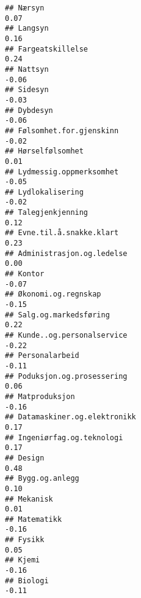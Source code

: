 \documentclass[
]{article}
\begin{document}
\begin{verbatim}
## Nærsyn                                                                            0.07
## Langsyn                                                                           0.16
## Fargeatskillelse                                                                  0.24
## Nattsyn                                                                          -0.06
## Sidesyn                                                                          -0.03
## Dybdesyn                                                                         -0.06
## Følsomhet.for.gjenskinn                                                          -0.02
## Hørselfølsomhet                                                                   0.01
## Lydmessig.oppmerksomhet                                                          -0.05
## Lydlokalisering                                                                  -0.02
## Talegjenkjenning                                                                  0.12
## Evne.til.å.snakke.klart                                                           0.23
## Administrasjon.og.ledelse                                                         0.00
## Kontor                                                                           -0.07
## Økonomi.og.regnskap                                                              -0.15
## Salg.og.markedsføring                                                             0.22
## Kunde..og.personalservice                                                        -0.22
## Personalarbeid                                                                   -0.11
## Poduksjon.og.prosessering                                                         0.06
## Matproduksjon                                                                    -0.16
## Datamaskiner.og.elektronikk                                                       0.17
## Ingeniørfag.og.teknologi                                                          0.17
## Design                                                                            0.48
## Bygg.og.anlegg                                                                    0.10
## Mekanisk                                                                          0.01
## Matematikk                                                                       -0.16
## Fysikk                                                                            0.05
## Kjemi                                                                            -0.16
## Biologi                                                                          -0.11

\end{verbatim}
\end{document}
